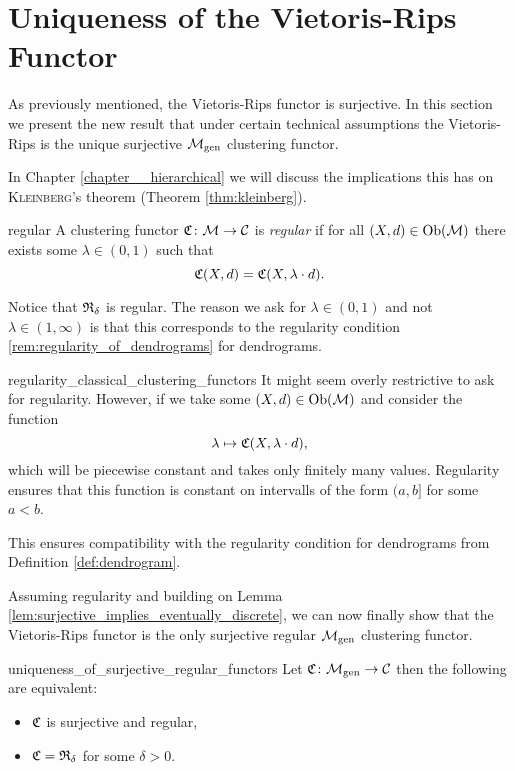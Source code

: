 \section{Uniqueness of the Vietoris-Rips Functor}

As previously mentioned, the Vietoris-Rips functor is surjective.
In this section we present the new result that under certain technical assumptions the Vietoris-Rips is the unique surjective ${\mathcal{M}_\mathrm{gen}}$ clustering functor.

In Chapter \ref{chapter__hierarchical} we will discuss the implications this has on \textsc{Kleinberg}'s theorem (Theorem \ref{thm:kleinberg}).

\begin{definition}{}{regular}
    A clustering functor $\mathfrak{C}\colon \mathcal{M} \to \mathcal{C}$ is \emph{regular} if for all $(X,d) \in \mathrm {Ob}(\mathcal{M})$ there exists some $\lambda \in (0, 1)$ such that
    $$
    \mathfrak{C}(X,d) = \mathfrak{C}(X, \lambda \cdot d).
    $$
\end{definition}

Notice that $\mathfrak{R}_\delta$ is regular. 
The reason we ask for $\lambda \in (0,1)$ and not $\lambda \in (1, \infty)$ is that this corresponds to the regularity condition \ref{rem:regularity_of_dendrograms} for dendrograms.\par

\begin{myremark}{}{regularity_classical_clustering_functors}
It might seem overly restrictive to ask for regularity.
However, if we take some $(X, d) \in \mathrm {Ob}(\mathcal{M})$ and consider the function 
$$
\lambda \mapsto \mathfrak{C}(X, \lambda \cdot d),
$$
which will be piecewise constant and takes only finitely many values.
Regularity ensures that this function is constant on intervalls of the form $(a, b]$ for some $a < b$.

This ensures compatibility with the regularity condition for dendrograms from Definition \ref{def:dendrogram}.
\end{myremark}

Assuming regularity and building on Lemma \ref{lem:surjective_implies_eventually_discrete}, we can now finally show that the Vietoris-Rips functor is the only surjective regular ${\mathcal{M}_\mathrm{gen}}$ clustering functor.

\begin{theorem}{}{uniqueness_of_surjective_regular_functors}
    Let $\mathfrak{C}\colon {\mathcal{M}_\mathrm{gen}} \to \mathcal{C}$ then the following are equivalent:

    \begin{itemize}
        \item $\mathfrak{C}$ is surjective and regular,
        \item $\mathfrak{C} = \mathfrak{R}_{\delta}$ for some $\delta > 0$.
    \end{itemize}
\end{theorem}

